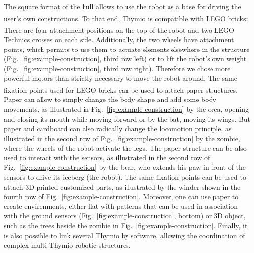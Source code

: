 \documentclass[letterpaper, 10 pt, conference]{ieeeconf}  %
\begin{document}
The square format of the hull allows to use the robot as a base for driving the user's own constructions.
To that end, Thymio is compatible with LEGO\textsuperscript{\textregistered} bricks:
There are four attachment positions on the top of the robot and two LEGO\textsuperscript{\textregistered} Technics crosses on each side.
Additionally, the two wheels have attachment points, which permits to use them to actuate elements elsewhere in the structure (Fig.~\ref{fig:example-construction}, third row left) or to lift the robot's own weight (Fig.~\ref{fig:example-construction}, third row right).
Therefore we chose more powerful motors than strictly necessary to move the robot around.
The same fixation points used for LEGO\textsuperscript{\textregistered} bricks can be used to attach paper structures.
Paper can allow to simply change the body shape and add some body movements, as illustrated in Fig.~\ref{fig:example-construction} by the orca, opening and closing its mouth while moving forward or by the bat, moving its wings. 
But paper and cardboard can also radically change the locomotion principle, as illustrated in the second row of Fig.~\ref{fig:example-construction} by the zombie, where the wheels of the robot activate the legs. 
The paper structure can be also used to interact with the sensors, as illustrated in the second row of Fig.~\ref{fig:example-construction} by the bear, who extends his paw in front of the sensors to drive its iceberg (the robot).
The same fixation points can be used to attach 3D printed customized parts, as illustrated by the winder shown in the fourth row of Fig.~\ref{fig:example-construction}.
Moreover, one can use paper to create environments, either flat with patterns that can be used in association with the ground sensors (Fig.~\ref{fig:example-construction}, bottom) or 3D object, such as the trees beside the zombie in Fig.~\ref{fig:example-construction}.
Finally, it is also possible to link several Thymio by software, allowing the coordination of complex multi-Thymio robotic structures.
\end{document}
